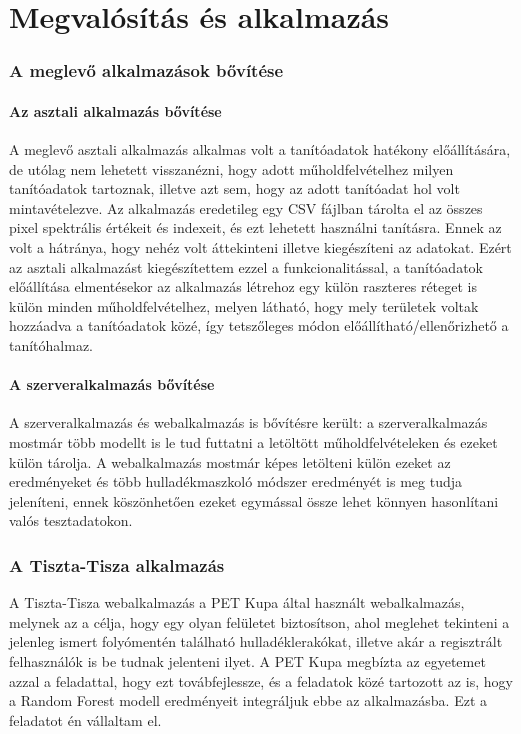 \chapter{Megvalósítás és alkalmazás}
\label{ch:impl}

\subsection{A meglevő alkalmazások bővítése}
\label{ch:application-improvement}

\subsubsection {Az asztali alkalmazás bővítése}

A meglevő asztali alkalmazás alkalmas volt a tanítóadatok hatékony előállítására, de utólag nem lehetett visszanézni, hogy adott műholdfelvételhez milyen tanítóadatok tartoznak, illetve azt sem, hogy az adott tanítóadat hol volt mintavételezve. Az alkalmazás eredetileg egy CSV fájlban \cite{rfc4180} tárolta el az összes pixel spektrális értékeit és indexeit, és ezt lehetett használni tanításra. Ennek az volt a hátránya, hogy nehéz volt áttekinteni illetve kiegészíteni az adatokat. Ezért az asztali alkalmazást kiegészítettem ezzel a funkcionalitással, a tanítóadatok előállítása elmentésekor az alkalmazás létrehoz egy külön raszteres réteget is külön minden műholdfelvételhez, melyen látható, hogy mely területek voltak hozzáadva a tanítóadatok közé, így tetszőleges módon előállítható/ellenőrizhető a tanítóhalmaz.

\subsubsection {A szerveralkalmazás bővítése}

A szerveralkalmazás és webalkalmazás is bővítésre került: a szerveralkalmazás mostmár több modellt is le tud futtatni a letöltött műholdfelvételeken és ezeket külön tárolja. A webalkalmazás mostmár képes letölteni külön ezeket az eredményeket és több hulladékmaszkoló módszer eredményét is meg tudja jeleníteni, ennek köszönhetően ezeket egymással össze lehet könnyen hasonlítani valós tesztadatokon. 

\subsection{A Tiszta-Tisza alkalmazás}

A Tiszta-Tisza webalkalmazás  a PET Kupa által használt webalkalmazás, melynek az a célja, hogy egy olyan felületet biztosítson, ahol meglehet tekinteni a jelenleg ismert folyómentén található hulladéklerakókat, illetve akár a regisztrált felhasználók is be tudnak jelenteni ilyet. A PET Kupa megbízta az egyetemet azzal a feladattal, hogy ezt továbfejlessze, és a feladatok közé tartozott az is, hogy a Random Forest modell eredményeit integráljuk ebbe az alkalmazásba. Ezt a feladatot én vállaltam el.

